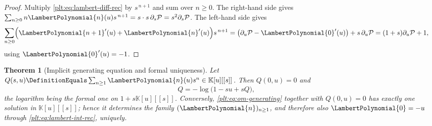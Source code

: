 \documentclass[11pt,oneside]{article}
\theoremstyle{plain}
\newtheorem{theorem}{Theorem}[section]
\theoremstyle{definition}
\theoremstyle{remark}
\newcommand{\K}{\mathbb{K}}
\newcommand{\LamP}[1]{\LambertPolynomial{#1}}
\begin{document}
\begin{proof}
Multiply \eqref{plt:eq:lambert-diff-rec} by \(s^{\,n+1}\) and sum over
\(n\ge0\).  The right-hand side gives
\(\sum_{n\ge0}n\LamP{n}(u)s^{\,n+1}=s\cdot s\,\partial_s\mathcal P
=s^{2}\partial_s\mathcal P\).  The left-hand side gives
\[
 \sum_{n\ge0}\Bigl({\LamP{n+1}}'(u)+{\LamP{n}}'(u)\Bigr)s^{\,n+1}
 =\bigl(\partial_u\mathcal P-{\LamP{0}}'(u)\bigr)+s\,\partial_u\mathcal P
 =(1+s)\partial_u\mathcal P+1,
\]
using \({\LamP{0}}'(u)=-1\).
\end{proof}

\begin{theorem}[Implicit generating equation and formal uniqueness]
\label{plt:thm:om-generating-equation}
Let \(Q(s,u)\DefinitionEquals\sum_{n\ge1}\LamP{n}(u)s^{n}\in\K[u][[s]]\).
Then \(Q(0,u)=0\) and
\begin{equation}\label{plt:eq:om-generating}
 Q=-\log\bigl(1-su+sQ\bigr),
\end{equation}
the logarithm being the formal one on \(1+s\K[u][[s]]\).  Conversely,
\eqref{plt:eq:om-generating} together with \(Q(0,u)=0\) has exactly one
solution in \(\K[u][[s]]\); hence it determines the family
\((\LamP{n})_{n\ge1}\), and therefore also \(\LamP{0}=-u\) through
\eqref{plt:eq:lambert-int-rec}, uniquely.
\end{theorem}
\end{document}
